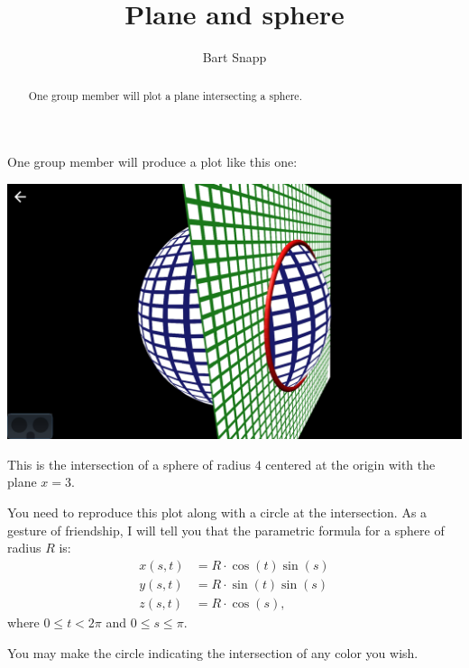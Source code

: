 \documentclass{ximera}
\author{Bart Snapp}
\title{Plane and sphere}
\begin{document}
\begin{abstract}
  One group member will plot a plane intersecting a sphere.
\end{abstract}
\maketitle

One group member will produce a plot like this one:
\begin{image}
  \includegraphics{planeAndSphere.png}
\end{image}

This is the intersection of a sphere of radius $4$ centered at the origin with the plane $x=3$.

You need to reproduce this plot along with a circle at the
intersection.
As a gesture of friendship, I will tell you that the parametric
formula for a sphere of radius $R$ is:
\begin{align*}
  x(s,t) &= R\cdot \cos(t)\sin(s)\\
  y(s,t) &= R\cdot \sin(t)\sin(s)\\
  z(s,t) &= R\cdot \cos(s),
\end{align*}
where $0\le t< 2\pi$ and $0\le s \le \pi$.

You may make the circle indicating the intersection of any color you
wish.
\end{document}
